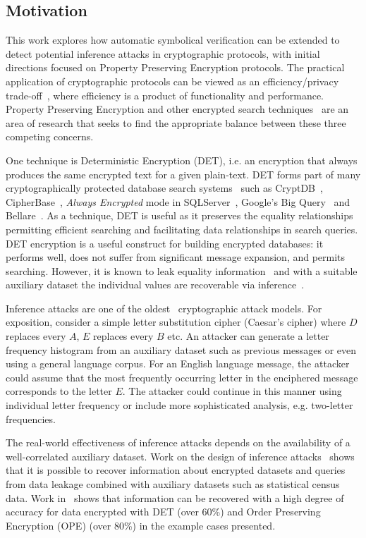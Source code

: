 \documentclass[runningheads]{llncs}
\begin{document}
\subsection{Motivation}
This work explores how automatic symbolical verification can be extended to detect potential inference attacks in cryptographic protocols, with initial directions focused on Property Preserving Encryption protocols.
The practical application of cryptographic protocols can be viewed as an efficiency/privacy trade-off~\cite{GenericAttacks}, where efficiency is a product of functionality and performance. Property Preserving Encryption and other encrypted search techniques~\cite{SOK2017} are an area of research that seeks to find the appropriate balance between these three competing concerns.   

One technique is Deterministic Encryption (DET), i.e. an encryption that always produces the same encrypted text for a given plain-text. DET forms part of many cryptographically protected database search systems~\cite{SOK2017} such as CryptDB~\cite{Popa2011}, CipherBase~\cite{cipherbase}, \textit{Always Encrypted} mode in SQLServer~\cite{AlwaysEncrypted}, Google's Big Query~\cite{BigQuery} and Bellare~\cite{Bellare2007}. As a technique, DET is useful as it preserves the equality relationships permitting efficient searching and facilitating data relationships in search queries. DET encryption is a useful construct for building encrypted databases: it performs well, does not suffer from significant message expansion, and permits searching. However, it is known to leak equality information~\cite{SOK2017} and with a suitable auxiliary dataset the individual values are recoverable via inference~\cite{InfrenceAttacks}. 

Inference attacks are one of the oldest~\cite{Arab} cryptographic attack models. For exposition, consider a simple letter substitution cipher (Caesar's cipher) where $D$ replaces every $A$, $E$ replaces every $B$ etc. An attacker can generate a letter frequency histogram from an auxiliary dataset such as previous messages or even using a general language corpus. For an English language message, the attacker could assume that the most frequently occurring letter in the enciphered message corresponds to the letter $E$. The attacker could continue in this manner using individual letter frequency or include more sophisticated analysis, e.g. two-letter frequencies.

The real-world effectiveness of inference attacks depends on the availability of a well-correlated auxiliary dataset. Work on the design of inference attacks~\cite{Ismal2012} shows that it is possible to recover information about encrypted datasets and queries from data leakage combined with auxiliary datasets such as statistical census data. Work in~\cite{InfrenceAttacks} shows that information can be recovered with a high degree of accuracy for data encrypted with DET (over 60\%) and Order Preserving Encryption (OPE) (over 80\%) in the example cases presented.
\end{document}
